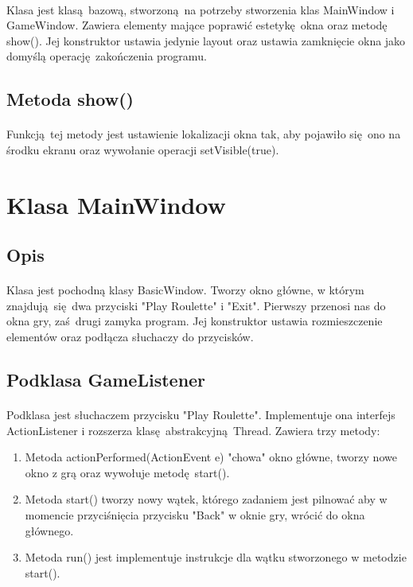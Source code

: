 \documentclass[11pt,a4paper]{article}
\begin{document}
\paragraph{}
Klasa jest klasą bazową, stworzoną na potrzeby stworzenia klas MainWindow i GameWindow. Zawiera elementy mające poprawić estetykę okna oraz metodę show(). Jej konstruktor ustawia jedynie layout oraz ustawia zamknięcie okna jako domyślą operację zakończenia programu.
\subsection{Metoda show()}
\paragraph{}
Funkcją tej metody jest ustawienie lokalizacji okna tak, aby pojawiło się ono na środku ekranu oraz wywołanie operacji setVisible(true).
\section{Klasa MainWindow}
\subsection{Opis}
\paragraph{}
Klasa jest pochodną klasy BasicWindow. Tworzy okno główne, w którym znajdują się dwa przyciski
"Play Roulette" i "Exit". Pierwszy przenosi nas do okna gry, zaś drugi zamyka program. Jej konstruktor ustawia rozmieszczenie elementów oraz podłącza słuchaczy do przycisków.
\subsection{Podklasa GameListener}
\paragraph{}
Podklasa jest słuchaczem przycisku "Play Roulette". Implementuje ona interfejs ActionListener i rozszerza klasę abstrakcyjną Thread. Zawiera trzy metody:
\begin{enumerate}
  \item Metoda actionPerformed(ActionEvent e) "chowa" okno główne, tworzy nowe okno z grą oraz wywołuje metodę start().
  \item Metoda start() tworzy nowy wątek, którego zadaniem jest pilnować aby w momencie przyciśnięcia przycisku "Back" w oknie gry, wrócić do okna głównego.
  \item Metoda run() jest implementuje instrukcje dla wątku stworzonego w metodzie start().
\end{enumerate}
\end{document}
